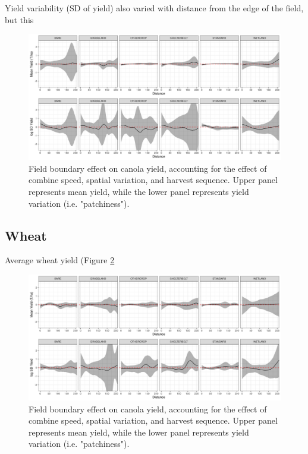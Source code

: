 \documentclass[]{elsarticle} %
\begin{document}
Yield variability (SD of yield) also varied with distance from the edge of the field, but this

\begin{figure}
\includegraphics[width=1\linewidth]{../Figures/ModelSummary3a_canola} \caption{Field boundary effect on canola yield, accounting for the effect of combine speed, spatial variation, and harvest sequence. Upper panel represents mean yield, while the lower panel represents yield variation (i.e. "patchiness").}\label{fig:canolaPlot}
\end{figure}

\hypertarget{wheat}{%
\subsection{Wheat}\label{wheat}}

Average wheat yield (Figure \ref{fig:wheatPlot}

\begin{figure}
\includegraphics[width=1\linewidth]{../Figures/ModelSummary3a_wheat} \caption{Field boundary effect on canola yield, accounting for the effect of combine speed, spatial variation, and harvest sequence. Upper panel represents mean yield, while the lower panel represents yield variation (i.e. "patchiness").}\label{fig:wheatPlot}
\end{figure}
\end{document}
